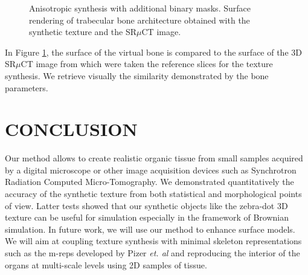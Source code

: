\begin{figure}
 \vspace{-0.2cm}
 \centering
 \caption{Anisotropic synthesis with additional binary masks. Surface rendering of trabecular bone architecture obtained with the synthetic texture and the SR$\mu$CT image.}
 \label{fig:bone_surface_rendering}
 \vspace{-0.1cm}
\end{figure}

In Figure \ref{fig:bone_surface_rendering}, the surface of the virtual bone is 
compared to the surface of the 3D SR$\mu$CT image from which were taken 
the reference slices for the texture synthesis. 
We retrieve visually the similarity demonstrated by the bone parameters.

\section{\uppercase{Conclusion}}
\label{sec:Conclusions}

Our method allows to create realistic organic tissue from small samples acquired by a digital microscope or
other image acquisition devices such as Synchrotron Radiation Computed Micro-Tomography. We demonstrated quantitatively the accuracy of 
the synthetic texture from both statistical and morphological points of view. 
Latter tests showed that our synthetic objects like the zebra-dot 3D texture can be useful for simulation especially in the framework of Brownian simulation. 
In future work, we will use our method to enhance surface models. We will aim at coupling texture synthesis with minimal skeleton 
representations such as the m-reps developed by Pizer \emph{et. al} \cite{Pizer:2003:DMM:945881.945883}
and reproducing the interior of the organs at multi-scale levels using 2D samples of tissue. 


\vfill

{\small
}

\vfill
